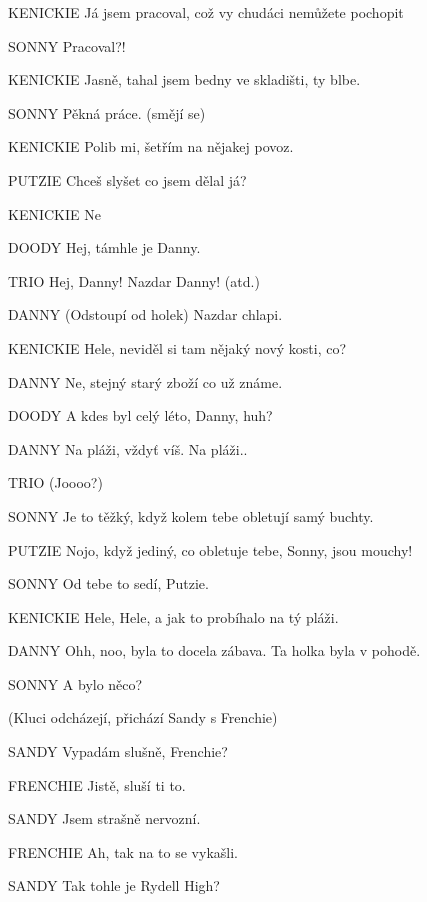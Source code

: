 KENICKIE        Já jsem pracoval, což vy chudáci nemůžete pochopit

SONNY        Pracoval?!

KENICKIE                Jasně, tahal jsem bedny ve skladišti, ty blbe.

SONNY                Pěkná práce. (smějí se)

KENICKIE                Polib mi, šetřím na nějakej povoz.

PUTZIE                Chceš slyšet co jsem dělal já?

KENICKIE                 Ne

DOODY                Hej, támhle je Danny.

TRIO                Hej, Danny! Nazdar Danny! (atd.)

DANNY                (Odstoupí od holek) Nazdar chlapi. 

KENICKIE                Hele, neviděl si tam nějaký nový kosti, co?

DANNY                Ne, stejný starý zboží co už známe.

DOODY                A kdes byl celý léto, Danny, huh?

DANNY                Na pláži, vždyť víš. Na pláži..

TRIO                (Joooo?)

SONNY                Je to těžký, když kolem tebe obletují samý buchty.

PUTZIE                Nojo, když jediný, co obletuje tebe, Sonny, jsou mouchy!

SONNY                Od tebe to sedí, Putzie.

KENICKIE                Hele, Hele, a jak to probíhalo na tý pláži. 

DANNY                Ohh, noo, byla to docela zábava. Ta holka byla v pohodě.

SONNY                A bylo něco?

(Kluci odcházejí, přichází Sandy s Frenchie)





SANDY                Vypadám slušně, Frenchie?

FRENCHIE                Jistě, sluší ti to.

SANDY                Jsem strašně nervozní.

FRENCHIE                Ah, tak na to se vykašli.

SANDY                Tak tohle je Rydell High?

